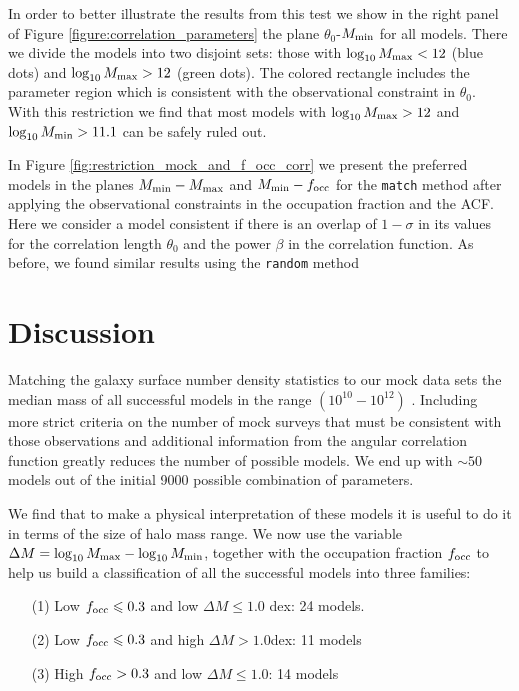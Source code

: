 \documentclass[usenatbib]{mn2e}
\newcommand{\hMsun}{{\ifmmode{h^{-1}{\rm
        {M_{\odot}}}}\else{$h^{-1}{\rm{M_{\odot}}}$}\fi}}
\begin{document}
In order to better illustrate the results from this test we
show in the right panel of Figure \ref{figure:correlation_parameters} 
the plane $\theta_{0}$-$M_{\rm min}$ for all models. There we divide
the models into two disjoint sets: those with $\log_{10} M_{\rm
    max}<12$ (blue dots) and $\log_{10} M_{\rm
    max}>12$ (green dots). The colored rectangle includes
the parameter region which is consistent with the observational
constraint in $\theta_{0}$. With this restriction we find that most
models with $\log_{10} M_{\rm max}>12$ and  $\log_{10} M_{\rm min}>11.1$ 
can be safely ruled out.  



In Figure \ref{fig:restriction_mock_and_f_occ_corr} we present the preferred
models in the planes $M_{\rm min}-M_{\rm  max}$ and $M_{\rm min}-f_{\rm occ}$
for the {\tt match} method after applying the observational constraints 
in the occupation fraction and the ACF. Here we consider a model
consistent if there is an overlap of $1-\sigma$ in its values for the
correlation length $\theta_0$ and the power $\beta$ in the
correlation function.  As before, we found similar results using the {\tt random} method


\section{Discussion}

Matching the galaxy surface number density statistics to
our mock  data sets the median
mass of all successful models in the range $(10^{10}-10^{12})$
\hMsun. Including more strict criteria on the number of mock surveys
that must be consistent with those observations and additional
information from the angular correlation function greatly reduces the
number of possible models. We end up with $\sim 50$ models out of the
initial 9000 possible combination of parameters.  

We find that to make a physical interpretation of these models it is
useful to do it in terms of the size of halo mass range. We now use the
variable $\Delta M=\log_{10}M_{\rm max} - \log_{10}M_{\rm  min}$, together
with the occupation fraction $f_{\rm occ}$ to help us build a classification
of all the successful models into three families: 


\begin{itemize}
\item[(1)] Low $f_{\rm occ}\leq 0.3$ and low $\Delta M\leq 1.0$
  dex: 24 models.
\item[(2)] Low $f_{\rm occ}\leq 0.3$ and high $\Delta M > 1.0$dex: 11
  models
\item[(3)] High $f_{\rm occ}> 0.3$ and low $\Delta M\leq 1.0$: 14 models
\end{itemize}
\end{document}
